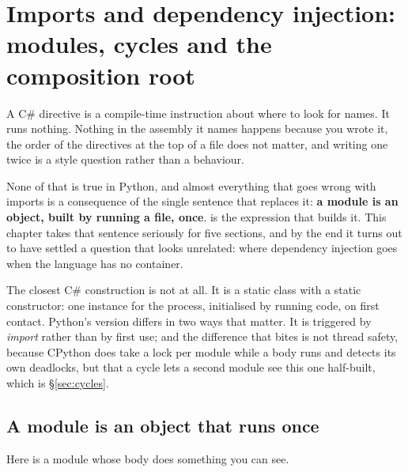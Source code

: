 
\chapter{Imports and dependency injection: modules, cycles and the composition root}
\label{ch:imports}

\noindent
A C\#  directive is a compile-time instruction about where to
look for names. It runs nothing. Nothing in the assembly it names happens
because you wrote it, the order of the directives at the top of a file does
not matter, and writing one twice is a style question rather than a
behaviour.

None of that is true in Python, and almost everything that goes wrong with
imports is a consequence of the single sentence that replaces it:
\textbf{a module is an object, built by running a file, once}.
 is the expression that builds it. This chapter takes that
sentence seriously for five sections, and by the end it turns out to have
settled a question that looks unrelated: where dependency injection goes
when the language has no container.

\begin{csbox}
The closest C\# construction is not  at all. It is a static
class with a static constructor: one instance for the process, initialised
by running code, on first contact. Python's version differs in two ways
that matter. It is triggered by \emph{import} rather than by first use; and
the difference that bites is not thread safety, because CPython does take a
lock per module while a body runs and detects its own deadlocks, but that a
cycle lets a second module see this one half-built, which is
\S\ref{sec:cycles}.
\end{csbox}

\section{A module is an object that runs once}
\label{sec:module-object}

Here is a module whose body does something you can see.


